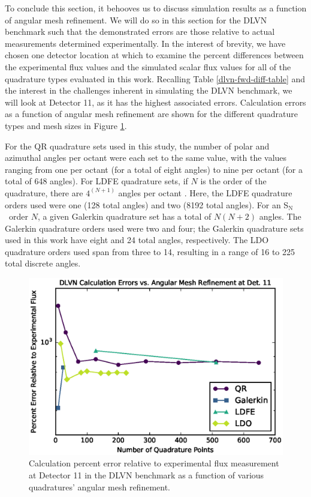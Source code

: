 \documentclass{article} %
\newcommand{\sn}{S$_\mathrm{N}$}
\begin{document}
To conclude this section, it behooves us to discuss simulation results as a
function of angular mesh refinement. We will do so in this section for the
DLVN benchmark such that the demonstrated errors are those relative to actual
measurements determined experimentally. In the interest of brevity, we have
chosen one detector location at which to examine the percent differences
between the experimental flux values and the simulated scalar flux values for
all of the quadrature types evaluated in this work. Recalling Table
\ref{dlvn-fwd-diff-table} and the interest in the challenges inherent in
simulating the DLVN benchmark, we will look at Detector 11, as it has the
highest associated errors. Calculation errors as a function of angular mesh
refinement are shown for the different quadrature types and mesh sizes in
Figure \ref{dlvn-scale-all}.

For the QR quadrature sets used in this study, the number of polar and
azimuthal angles per octant were each set to the same value, with the values
ranging from one per octant (for a total of eight angles) to nine per octant
(for a total of 648 angles). For LDFE quadrature sets, if $N$ is the order of
the quadrature, there are $4^{(N+1)}$ angles per octant \cite{exum}. Here, the
LDFE quadrature orders used were one (128 total angles) and two (8192 total
angles). For an \sn\ order $N$, a given Galerkin quadrature set has a total of
$N(N+2)$ angles. The Galerkin quadrature orders used were two and four; the
Galerkin quadrature sets used in this work have eight and 24 total angles,
respectively. The LDO quadrature orders used span from three to 14, resulting
in a range of 16 to 225 total discrete angles.

\begin{figure}[!htb]
\centering
\includegraphics{dlvn-error-scale-11.eps}
\caption{Calculation percent error relative to experimental flux 
         measurement at Detector 11 in the DLVN benchmark as a function of 
         various quadratures' angular mesh refinement.}
\label{dlvn-scale-all}
\end{figure}
\end{document}
